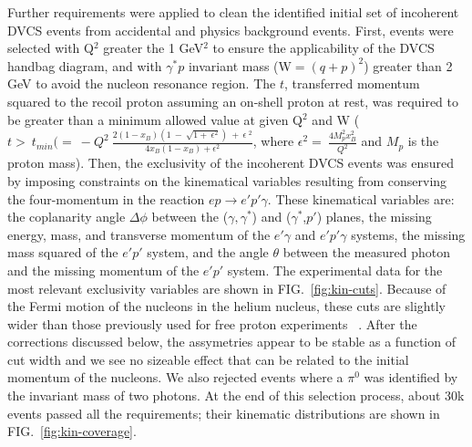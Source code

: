 \documentclass[twocolumn,nofootinbib,showpacs,prl,superscriptaddress,secnumarabic,amssymb,nobibnotes,aps,floatfix]{revtex4}
\begin{document}
Further requirements were applied to clean the identified initial set of 
incoherent DVCS events from accidental and physics background events. First, 
events were selected with Q$^{2}$ greater the 1 GeV$^2$ to ensure the 
applicability of the DVCS handbag diagram, and with $\gamma^{*}p$ invariant 
mass (W$=(q+p)^2$) greater than 2 GeV to avoid the nucleon resonance region. 
The $t$, transferred momentum squared to the recoil proton assuming an on-shell 
proton at rest, was required to be greater than a minimum allowed value at 
given Q$^2$ and W ($t>~t_{min}(=~- Q^{2}~\frac{2(1- x_{B})(1~-~\sqrt{1 
+~\epsilon^{2}})~+~\epsilon~^{2}}{4x_{B}(1-x_{B})+\epsilon^{2}}$,
where $\epsilon^{2}=~\frac{4M^{2}_{p}x^{2}_{B}}{Q^{2}}$ and $M_{p}$ is the 
proton mass). Then, the exclusivity of the incoherent DVCS events was ensured 
by imposing constraints on the kinematical variables resulting from conserving 
the four-momentum in the reaction $ep\rightarrow e'p'\gamma$.  These 
kinematical variables are: the coplanarity angle $\Delta\phi$ between the 
($\gamma,\gamma^*$) and ($\gamma^*$,$p'$) planes, the missing energy, mass, and 
transverse momentum of the $e'\gamma$ and $e'p'\gamma$ systems, the missing 
mass squared of the $e'p'$ system, and the angle $\theta$ between the measured 
photon and the missing momentum of the $e'p'$ system. The experimental data for 
the most relevant exclusivity variables are shown in FIG.~\ref{fig:kin-cuts}.  
Because of the Fermi motion of the nucleons in the helium nucleus, these cuts
are slightly wider than those previously used for free proton experiments~%
\cite{Girod:2007aa}. After the corrections discussed below, the assymetries 
appear to be stable as a function of cut width and we see no sizeable effect 
that can be related to the initial momentum of the nucleons. We also rejected 
events where a $\pi^0$ was identified by the invariant mass of 
two photons. At the end of this selection process, about 30k events 
passed all the requirements; their kinematic distributions are shown in 
FIG.~\ref{fig:kin-coverage}.  
\end{document}
